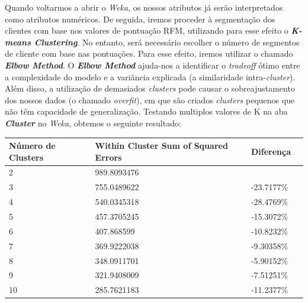 \documentclass{easychair}
\begin{document}
Quando voltarmos a abrir o \textit{Weka}, os nossos atributos já serão interpretados como atributos numéricos. De seguida, iremos proceder à segmentação dos clientes com base nos valores de pontuação RFM, utilizando para esse efeito o \textit{\textbf{K-means Clustering}}. No entanto, será necessário escolher o número de segmentos de cliente com base nas pontuações. Para esse efeito, iremos utilizar o chamado \textit{\textbf{Elbow Method}}\cite{RCCAFRM}.
O \textit{\textbf{Elbow Method}} ajuda-nos a identificar o \textit{tradeoff} ótimo entre a complexidade do modelo e a variância explicada (a similaridade intra-\textit{cluster}). Além disso, a utilização de demasiados \textit{clusters} pode causar o sobreajustamento dos nossos dados (o chamado \textit{overfit}), em que são criados \textit{clusters} pequenos que não têm capacidade de generalização.
Testando multiplos valores de K na aba \textit{\textbf{Cluster}} no \textit{Weka}, obtemos o seguinte resultado:

\begin{table}[htb]
\centering
\begin{tabular}{l|l|l|l}
Número de Clusters & Within Cluster Sum of Squared Errors  & Diferença &   \\
\hline
2                  & 989.8093476                                    &         &   \\
3                  & 755.0489622                                    & -23.7177\%  &   \\
4                  & 540.0345318                                    & -28.4769\% &   \\
5                  & 457.3705245                                    & -15.3072\%  &   \\
6                  & 407.868599                                     & -10.8232\%  &   \\
7                  & 369.9222038                                    & -9.30358\%  &   \\
8                  & 348.0911701                                    & -5.90152\%  &   \\
9                  & 321.9408009                                    & -7.51251\%  &   \\
10                 & 285.7621183                                    & -11.2377\%  &  
\end{tabular}
\end{table}
\end{document}

